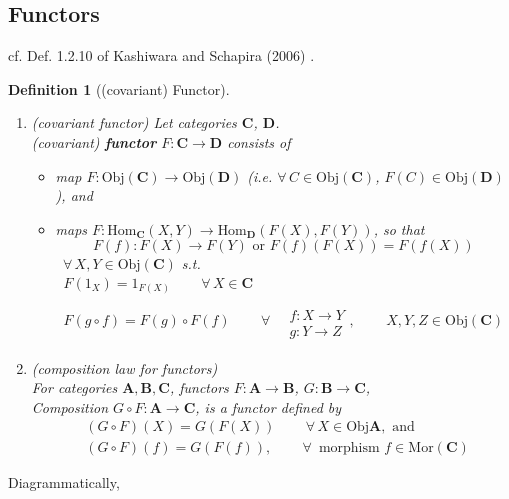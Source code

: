 \documentclass[10pt]{amsart}
\newtheorem{definition}{Definition}
\begin{document}
\begin{multicols*}{2}
\section{Functors}

cf. Def. 1.2.10 of Kashiwara and Schapira (2006) \cite{KaSch2006}. 

\begin{definition}[(covariant) Functor]
\begin{enumerate}
	\item (covariant functor) Let categories $\mathbf{C}$, $\mathbf{D}$. \\
(covariant) \textbf{functor} $F: \mathbf{C} \to \mathbf{D}$ consists of 
\begin{itemize}
	\item map $F: \text{Obj}(\mathbf{C}) \to \text{Obj}(\mathbf{D})$ (i.e. $\forall \, C \in \text{Obj}(\mathbf{C})$, $F(C) \in \text{Obj}(\mathbf{D})$), and 
	\item maps $F: \text{Hom}_{\mathbf{C}}(X,Y) \to \text{Hom}_{\mathbf{D}}(F(X), F(Y))$, so that 
		\[	
			F(f) : F(X) \to F(Y) \text{ or } F(f)(F(X)) = F(f(X)) 
		\] \, $\forall \, X,Y \in \text{Obj}(\mathbf{C})$ s.t.
	\begin{equation}
	\begin{gathered}
	F(1_X) = 1_{F(X)} \qquad \, \forall \, X \in \mathbf{C} \\
	F(g\circ f) = F(g) \circ F(f) \qquad \, \forall \, \begin{aligned} & \quad \\ 
	& f: X \to Y \\
	& g: Y \to Z \end{aligned}, \qquad \, X,Y,Z \in \text{Obj}(\mathbf{C})
	\end{gathered}
	\end{equation}
\end{itemize}
\item (composition law for functors) \\
For categories $\mathbf{A} , \mathbf{B}, \mathbf{C}$, functors $F: \mathbf{A} \to \mathbf{B}$, $G: \mathbf{B} \to \mathbf{C}$, \\
Composition $G\circ F : \mathbf{A} \to \mathbf{C}$, is a functor defined by 
\begin{equation}
\begin{aligned}
& (G\circ F)(X) = G(F(X)) \qquad \, \forall \, X \in \text{Obj}\mathbf{A}, \text{ and } \\
& (G\circ F)(f) = G(F(f)), \qquad \, \forall \, \text{ morphism } f \in \text{Mor}(\mathbf{C})
\end{aligned}
\end{equation}
\end{enumerate}
\end{definition}
Diagrammatically,


\end{multicols*}
\end{document}
